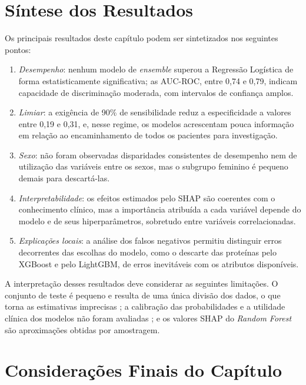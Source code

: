 \section{Síntese dos Resultados}
\label{sec:res_sintese}

Os principais resultados deste capítulo podem ser sintetizados nos seguintes pontos:

\begin{enumerate}
    \item \textit{Desempenho}: nenhum modelo de \textit{ensemble} superou a Regressão Logística de forma estatisticamente significativa; as AUC-ROC, entre 0,74 e 0,79, indicam capacidade de discriminação moderada, com intervalos de confiança amplos.
    \item \textit{Limiar}: a exigência de 90\% de sensibilidade reduz a especificidade a valores entre 0,19 e 0,31, e, nesse regime, os modelos acrescentam pouca informação em relação ao encaminhamento de todos os pacientes para investigação.
    \item \textit{Sexo}: não foram observadas disparidades consistentes de desempenho nem de utilização das variáveis entre os sexos, mas o subgrupo feminino é pequeno demais para descartá-las.
    \item \textit{Interpretabilidade}: os efeitos estimados pelo SHAP são coerentes com o conhecimento clínico, mas a importância atribuída a cada variável depende do modelo e de seus hiperparâmetros, sobretudo entre variáveis correlacionadas.
    \item \textit{Explicações locais}: a análise dos falsos negativos permitiu distinguir erros decorrentes das escolhas do modelo, como o descarte das proteínas pelo XGBoost e pelo LightGBM, de erros inevitáveis com os atributos disponíveis.
\end{enumerate}

A interpretação desses resultados deve considerar as seguintes limitações. O conjunto de teste é pequeno e resulta de uma única divisão dos dados, o que torna as estimativas imprecisas \cite{Vergouwe2005Substantial}; a calibração das probabilidades e a utilidade clínica dos modelos não foram avaliadas \cite{Vickers2006Decision}; e os valores SHAP do \textit{Random Forest} são aproximações obtidas por amostragem.

\section{Considerações Finais do Capítulo}
\label{sec:res_consideracoes}

